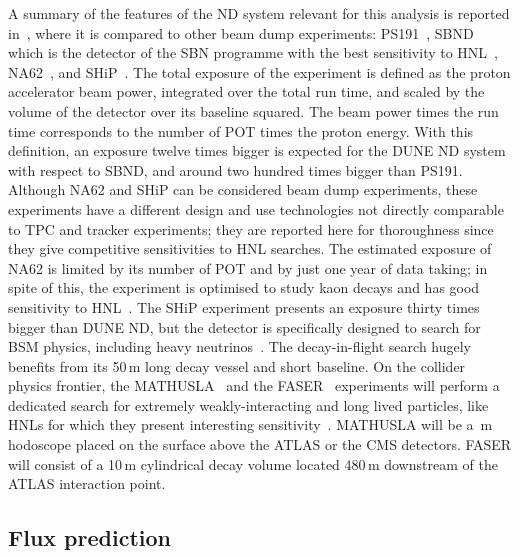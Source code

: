 A summary of the features of the ND system relevant for this analysis is reported in~, %
where it is compared to other beam dump experiments: %
PS191~\cite{Bernardi:1985ny,Bernardi:1987ek}, SBND which is the detector of the SBN programme with the best sensitivity to %
HNL~\cite{Ballett:2016opr}, NA62~\cite{NA62:2017rwk}, and SHiP~\cite{Anelli:2015pba}.
The total exposure of the experiment is defined as the proton accelerator beam power, integrated over the total run time, %
and scaled by the volume of the detector over its baseline squared.
The beam power times the run time corresponds to the number of POT times the proton energy. 
With this definition, an exposure twelve times bigger is expected for the DUNE ND system with respect to SBND, %
and around two hundred times bigger than PS191.
Although NA62 and SHiP can be considered beam dump experiments, these experiments have a different design %
and use technologies not directly comparable to TPC and tracker experiments; %
they are reported here for thoroughness since they give competitive sensitivities to HNL searches.
The estimated exposure of NA62 is limited by its number of POT and by just one year of data taking; %
in spite of this, the experiment is optimised to study kaon decays and has good %
sensitivity to HNL~\cite{Drewes:2018irr}.
The SHiP experiment presents an exposure thirty times bigger than DUNE ND, but the detector is specifically %
designed to search for BSM physics, including heavy neutrinos~\cite{SHiP:2018xqw,Caputo:2016ojx}.
The decay-in-flight search hugely benefits from its 50\,m long decay vessel and short baseline.
On the collider physics frontier, the MATHUSLA~\cite{Curtin:2018mvb} and the FASER~\cite{Ariga:2018uku} experiments %
will perform a dedicated search for extremely weakly-interacting and long lived particles, %
like HNLs for which they present interesting sensitivity~\cite{Curtin:2018mvb, Kling:2018wct}.
MATHUSLA will be a \,m hodoscope placed on the surface above the ATLAS or the CMS detectors.
FASER will consist of a 10\,m cylindrical decay volume located 480\,m downstream of the ATLAS interaction point. 

\subsection{Flux prediction}
\label{sec:tauneutrino}

